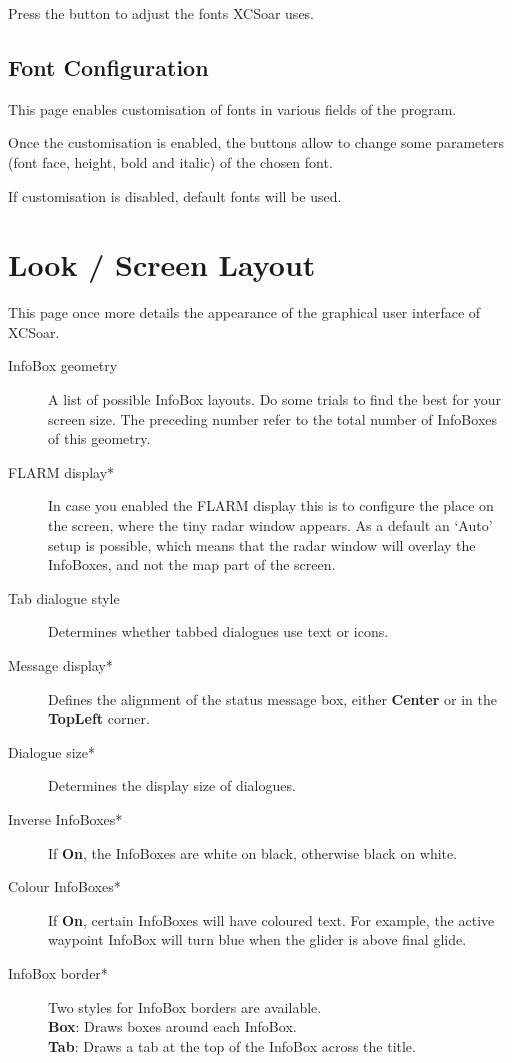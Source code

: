 Press the  button to adjust the fonts XCSoar uses.

\subsection*{Font Configuration}

This page enables customisation of fonts in various fields of the program.


Once the customisation is enabled, the  buttons allow to change 
some parameters (font face, height, bold and italic) of the chosen font.

If customisation is disabled, default fonts will be used.


\section{Look / Screen Layout}\label{sec:interface-appearance}
\label{conf:interface-appearance}

This page once more details the appearance of the graphical user interface of XCSoar.

\begin{description}
\item[InfoBox geometry]  A list of possible InfoBox layouts. Do some trials to find the 
  best for your screen size. The preceding number refer to the total number of 
  InfoBoxes of this geometry.
\item[FLARM display*]  \label{conf:flarmradar-place}
  In case you enabled the FLARM display this is to configure the
  place on the screen, where the tiny radar window appears. As a default an `Auto' setup 
  is possible, which means that the radar window will overlay the InfoBoxes, and not the map
  part of the screen.
\item[Tab dialogue style]  Determines whether tabbed dialogues use text or icons.
\item[Message display*]  Defines the alignment of the status message box, either 
  {\bf Center} or in the {\bf TopLeft} corner.
\item[Dialogue size*]  Determines the display size of dialogues.
\item[Inverse InfoBoxes*]  If {\bf On}, the InfoBoxes are white on black, otherwise 
  black on white.
\item[Colour InfoBoxes*]  If {\bf On}, certain InfoBoxes will have coloured text. For 
  example, the active waypoint InfoBox will turn blue when the glider is above final 
  glide.
\item[InfoBox border*]  Two styles for InfoBox borders are available. \\
  {\bf Box}: Draws boxes around each InfoBox. \\
  {\bf Tab}: Draws a tab at the top of the InfoBox across the 
  title. \\
\end{description}


